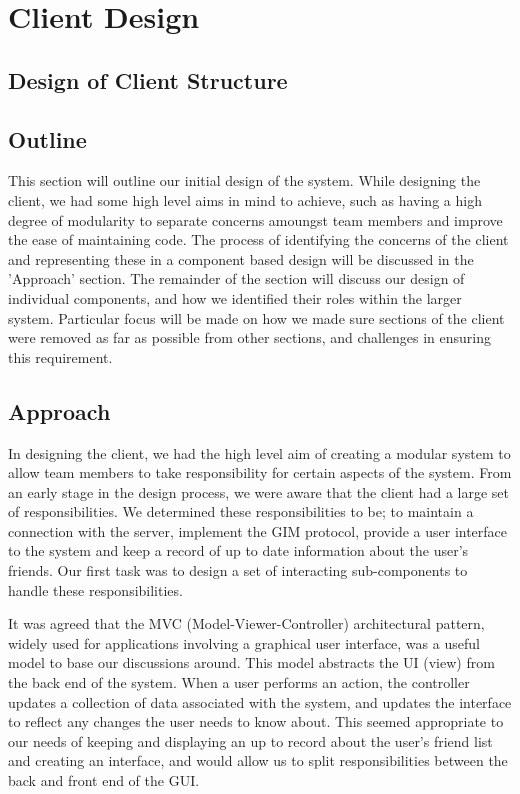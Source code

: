\section{Client Design}

\subsection{Design of Client Structure}

\subsection{Outline}

This section will outline our initial design of the system. While designing the client, we had some high level aims in mind to achieve, such as having a high degree of modularity to separate concerns amoungst team members and improve the ease of maintaining code. The process of identifying the concerns of the client and representing these in a component based design will be discussed in the 'Approach' section. The remainder of the section will discuss our design of individual components, and how we identified their roles within the larger system. Particular focus will be made on how we made sure sections of the client were removed as far as possible from other sections, and challenges in ensuring this requirement. 

\subsection{Approach}

In designing the client, we had the high level aim of creating a modular system to allow team members to take responsibility for certain aspects of the system. From an early stage in the design process, we were aware that the client had a large set of responsibilities. We determined these responsibilities to be;  to maintain a connection with the server, implement the GIM protocol, provide a user interface to the system and keep a record of up to date information about the user’s friends. Our first task was to design a set of interacting sub-components to handle these responsibilities.

It was agreed that the MVC (Model-Viewer-Controller) architectural pattern, widely used for applications involving a graphical user interface, was a useful model to base our discussions around. This model abstracts the UI (view) from the back end of the system. When a user performs an action, the controller updates a collection of data associated with the system, and updates the interface to reflect any changes the user needs to know about. This seemed appropriate to our needs of keeping and displaying an up to record about the user’s friend list and creating an interface, and would allow us to split responsibilities between the back and front end of the GUI. 

